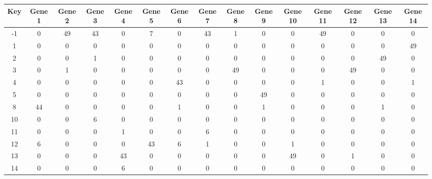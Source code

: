 \begin{tabular}{|c|c|c|c|c|c|c|c|c|c|c|c|c|c|c|}
\hline
Key & Gene 1 & Gene 2 & Gene 3 & Gene 4 & Gene 5 & Gene 6 & Gene 7 & Gene 8 & Gene 9 & Gene 10 & Gene 11 & Gene 12 & Gene 13 & Gene 14 \\
\hline
-1 & 0 & 49 & 43 & 0 & 7 & 0 & 43 & 1 & 0 & 0 & 49 & 0 & 0 & 0 \\
1 & 0 & 0 & 0 & 0 & 0 & 0 & 0 & 0 & 0 & 0 & 0 & 0 & 0 & 49 \\
2 & 0 & 0 & 1 & 0 & 0 & 0 & 0 & 0 & 0 & 0 & 0 & 0 & 49 & 0 \\
3 & 0 & 1 & 0 & 0 & 0 & 0 & 0 & 49 & 0 & 0 & 0 & 49 & 0 & 0 \\
4 & 0 & 0 & 0 & 0 & 0 & 43 & 0 & 0 & 0 & 0 & 1 & 0 & 0 & 1 \\
5 & 0 & 0 & 0 & 0 & 0 & 0 & 0 & 0 & 49 & 0 & 0 & 0 & 0 & 0 \\
8 & 44 & 0 & 0 & 0 & 0 & 1 & 0 & 0 & 1 & 0 & 0 & 0 & 1 & 0 \\
10 & 0 & 0 & 6 & 0 & 0 & 0 & 0 & 0 & 0 & 0 & 0 & 0 & 0 & 0 \\
11 & 0 & 0 & 0 & 1 & 0 & 0 & 6 & 0 & 0 & 0 & 0 & 0 & 0 & 0 \\
12 & 6 & 0 & 0 & 0 & 43 & 6 & 1 & 0 & 0 & 1 & 0 & 0 & 0 & 0 \\
13 & 0 & 0 & 0 & 43 & 0 & 0 & 0 & 0 & 0 & 49 & 0 & 1 & 0 & 0 \\
14 & 0 & 0 & 0 & 6 & 0 & 0 & 0 & 0 & 0 & 0 & 0 & 0 & 0 & 0 \\
\hline
\end{tabular}